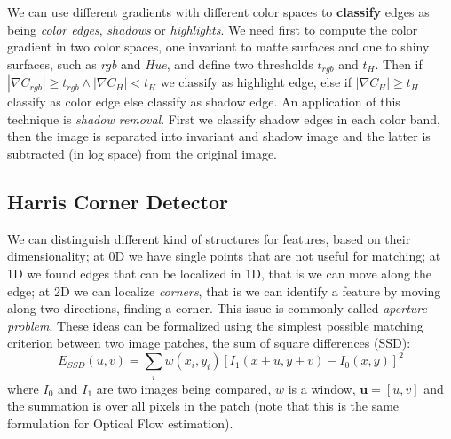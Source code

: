 \documentclass[a4paper,twocolumn]{article}
\begin{document}
We can use different gradients with different color spaces
to \textbf{classify} edges as being \textit{color edges}, \textit{shadows} or
\textit{highlights}. We need first to compute the color gradient in two color
spaces, one invariant to matte surfaces and one to shiny surfaces, such as
\textit{rgb} and \textit{Hue}, and define two thresholds $t_{rgb}$ and $t_H$.
Then if $|\nabla C_{rgb}| \ge t_{rgb} \wedge |\nabla C_H| < t_H$ we classify as
highlight edge, else if $|\nabla C_H| \ge t_H$ classify as color edge else
classify as shadow edge. An application of this technique is \textit{shadow removal}.
First we classify shadow edges in each color band, then the image is separated
into invariant and shadow image and the latter is subtracted (in log space) from
the original image.

\subsection{Harris Corner Detector}
We can distinguish different kind of structures for features, based on their
dimensionality; at 0D we have single points that are not useful for matching; at
1D we found edges that can be localized in 1D, that is we can move along the
edge; at 2D we can localize \textit{corners}, that is we can identify a feature
by moving along two directions, finding a corner. This issue is commonly called
\textit{aperture problem}. These ideas can be formalized using the simplest
possible matching criterion between two image patches, the sum of square
differences (SSD):
\begin{equation} \label{eq:ssd}
	E_{SSD}(u,v) = \sum_i w(x_i,y_i) [I_1(x+u,y+v) - I_0(x,y)]^2
\end{equation}
where $I_0$ and $I_1$ are two images being compared, $w$ is a window,
$\mathbf{u} = [u, v]$ and the summation is over all pixels in the patch (note
that this is the same formulation for Optical Flow estimation).
\end{document}
